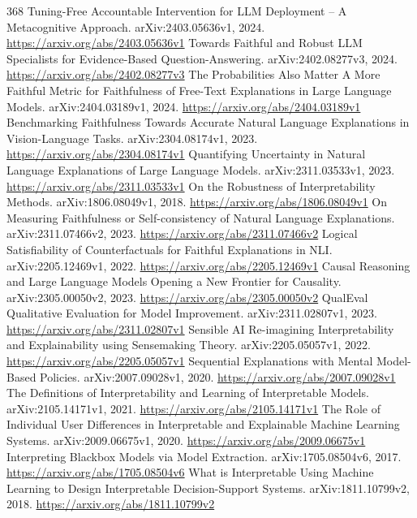 \documentclass[11pt]{article}
\begin{document}
\begin{thebibliography}{368}
 Tuning-Free Accountable Intervention for LLM Deployment -- A Metacognitive Approach. arXiv:2403.05636v1, 2024. \url{https://arxiv.org/abs/2403.05636v1}
 Towards Faithful and Robust LLM Specialists for Evidence-Based Question-Answering. arXiv:2402.08277v3, 2024. \url{https://arxiv.org/abs/2402.08277v3}
 The Probabilities Also Matter A More Faithful Metric for Faithfulness of Free-Text Explanations in Large Language Models. arXiv:2404.03189v1, 2024. \url{https://arxiv.org/abs/2404.03189v1}
 Benchmarking Faithfulness Towards Accurate Natural Language Explanations in Vision-Language Tasks. arXiv:2304.08174v1, 2023. \url{https://arxiv.org/abs/2304.08174v1}
 Quantifying Uncertainty in Natural Language Explanations of Large Language Models. arXiv:2311.03533v1, 2023. \url{https://arxiv.org/abs/2311.03533v1}
 On the Robustness of Interpretability Methods. arXiv:1806.08049v1, 2018. \url{https://arxiv.org/abs/1806.08049v1}
 On Measuring Faithfulness or Self-consistency of Natural Language Explanations. arXiv:2311.07466v2, 2023. \url{https://arxiv.org/abs/2311.07466v2}
 Logical Satisfiability of Counterfactuals for Faithful Explanations in NLI. arXiv:2205.12469v1, 2022. \url{https://arxiv.org/abs/2205.12469v1}
 Causal Reasoning and Large Language Models Opening a New Frontier for Causality. arXiv:2305.00050v2, 2023. \url{https://arxiv.org/abs/2305.00050v2}
 QualEval Qualitative Evaluation for Model Improvement. arXiv:2311.02807v1, 2023. \url{https://arxiv.org/abs/2311.02807v1}
 Sensible AI Re-imagining Interpretability and Explainability using Sensemaking Theory. arXiv:2205.05057v1, 2022. \url{https://arxiv.org/abs/2205.05057v1}
 Sequential Explanations with Mental Model-Based Policies. arXiv:2007.09028v1, 2020. \url{https://arxiv.org/abs/2007.09028v1}
 The Definitions of Interpretability and Learning of Interpretable Models. arXiv:2105.14171v1, 2021. \url{https://arxiv.org/abs/2105.14171v1}
 The Role of Individual User Differences in Interpretable and Explainable Machine Learning Systems. arXiv:2009.06675v1, 2020. \url{https://arxiv.org/abs/2009.06675v1}
 Interpreting Blackbox Models via Model Extraction. arXiv:1705.08504v6, 2017. \url{https://arxiv.org/abs/1705.08504v6}
 What is Interpretable Using Machine Learning to Design Interpretable Decision-Support Systems. arXiv:1811.10799v2, 2018. \url{https://arxiv.org/abs/1811.10799v2}

\end{thebibliography}
\end{document}
